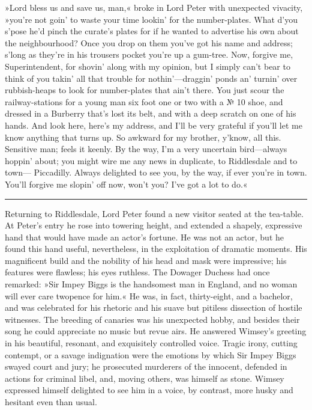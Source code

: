 »Lord bless us and save us, man,« broke in Lord Peter with unexpected vivacity, »you're not goin' to waste your time lookin' for the number-plates. What d'you s'pose he'd pinch the curate's plates for if he wanted to advertise his own about the neighbourhood? Once you drop on them you've got his name and address; s'long as they're in his trousers pocket you're up a gum-tree. Now, forgive me, Superintendent, for shovin' along with my opinion, but I simply can't bear to think of you takin' all that trouble for nothin'---draggin' ponds an' turnin' over rubbish-heaps to look for number-plates that ain't there. You just scour the railway-stations for a young man six foot one or two with a № 10 shoe, and dressed in a Burberry that's lost its belt, and with a deep scratch on one of his hands. And look here, here's my address, and I'll be very grateful if you'll let me know anything that turns up. So awkward for my brother, y'know, all this. Sensitive man; feels it keenly. By the way, I'm a very uncertain bird\allowbreak---\allowbreak always hoppin' about; you might wire me any news in duplicate, to Riddlesdale and to town\allowbreak--- Piccadilly. Always delighted to see you, by the way, if ever you're in town. You'll forgive me slopin' off now, won't you? I've got a lot to do.«

\noindent\hfil\rule{0.5\textwidth}{.4pt}\hfil

Returning to Riddlesdale, Lord Peter found a new visitor seated at the tea-table. At Peter's entry he rose into towering height, and extended a shapely, expressive hand that would have made an actor's fortune.  He was not an actor, but he found this hand useful, nevertheless, in the exploitation of dramatic moments. His magnificent build and the nobility of his head and mask were impressive; his features were flawless; his eyes ruthless. The Dowager Duchess had once remarked: »Sir Impey Biggs is the handsomest man in England, and no woman will ever care twopence for him.« He was, in fact, thirty-eight, and a bachelor, and was celebrated for his rhetoric and his suave but pitiless dissection of hostile witnesses. The breeding of canaries was his unexpected hobby, and besides their song he could appreciate no music but revue airs. He answered Wimsey's greeting in his beautiful, resonant, and exquisitely controlled voice. Tragic irony, cutting contempt, or a savage indignation were the emotions by which Sir Impey Biggs swayed court and jury; he prosecuted murderers of the innocent, defended in actions for criminal libel, and, moving others, was himself as stone. Wimsey expressed himself delighted to see him in a voice, by contrast, more husky and hesitant even than usual.

